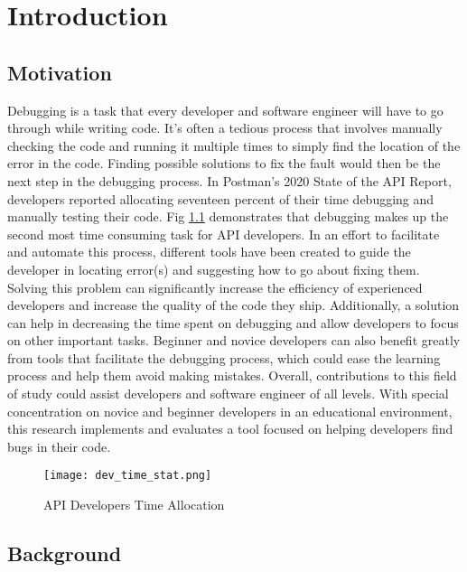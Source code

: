 \chapter{Introduction}
\label{ch:intro}

\section{Motivation}
\label{sec:motivation}

Debugging is a task that every developer and software engineer will have to go
through while writing code. It's often a
tedious process that involves manually checking the code and running it multiple
times to simply find the location of the error in the code. Finding possible
solutions to fix the fault would then be the next step in the debugging process.
In Postman's 2020 State of the API Report, developers reported allocating
seventeen percent of their time debugging and manually testing their code.
Fig \ref{fig:development_time} demonstrates that debugging makes up the
second most time consuming task for API developers.
In an effort to facilitate and automate this process, different tools have been
created to guide the developer in locating error(s) and suggesting how to go
about fixing them. Solving this problem can significantly increase the
efficiency of experienced developers and increase the quality of the code they
ship. Additionally, a solution can help in decreasing the time spent on
debugging and allow developers to focus on other important tasks.
Beginner and novice developers can also benefit greatly from tools
that facilitate the debugging process, which could ease the learning process and help
them avoid making mistakes. Overall, contributions to this field of study could
assist developers and software engineer of all levels.
With special concentration on novice and beginner developers in an educational
environment, this research implements and evaluates a tool focused on helping
developers find bugs in their code.

\begin{figure}[!htb]
	\begin{center}
		\texttt{[image: dev\_time\_stat.png]}
		\caption{\label{fig:development_time} API Developers Time Allocation}
	\end{center}
\end{figure}

\section{Background}
\label{sec:background}


